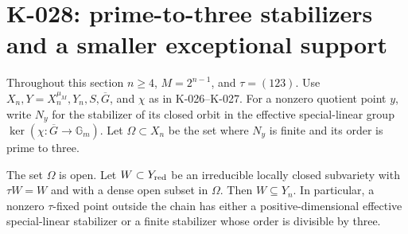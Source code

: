 \section{K-028: prime-to-three stabilizers and a smaller exceptional support}

Throughout this section $n\ge4$, $M=2^{n-1}$, and $\tau=(123)$.
Use $X_n,Y=X_n^{\mu_M},Y_n,S,\overline G$, and $\chi$ as in
K-026--K-027.  For a nonzero quotient point $y$, write $N_y$ for
the stabilizer of its closed orbit in the effective special-linear
group $\ker(\chi:\overline G\to\mathbb G_m)$.
Let $\Omega\subset X_n$ be the set where $N_y$ is finite and
its order is prime to three.

\begin{proposition}[K-028a]
The set $\Omega$ is open.  Let $W\subset Y_{\rm red}$ be an
irreducible locally closed subvariety with $\tau W=W$ and with
a dense open subset in $\Omega$.  Then $W\subseteq Y_n$.
In particular, a nonzero $\tau$-fixed point outside the chain
has either a positive-dimensional effective special-linear
stabilizer or a finite stabilizer whose order is divisible by
three.
\end{proposition}

